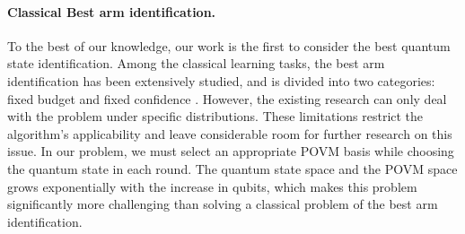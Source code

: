 
\paragraph{Classical Best arm identification.} To the best of our knowledge, our work is the first to consider the best quantum state identification. Among the classical learning tasks, the best arm identification \cite{audibert2010best, garivier2016optimal, russo2016simple, 6814096, gabillon2012best} has been extensively studied, and is divided into two categories: fixed budget \cite{bechhofer1968single} and fixed confidence \cite{paulson1964sequential}. However, the existing research can only deal with the problem under specific distributions. %
These limitations restrict the algorithm's applicability and leave considerable room for further research on this issue. In our problem, we must select an appropriate POVM basis while choosing the quantum state in each round. The quantum state space and the POVM space grows exponentially with the increase in qubits, which makes this problem significantly more challenging than solving a classical problem of the best arm identification.
